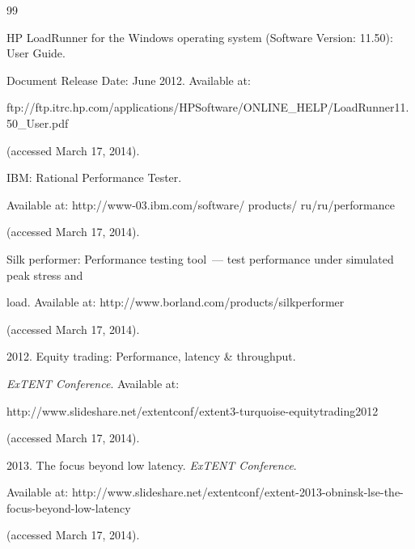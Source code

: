 {{\begin{thebibliography}{99}


  HP LoadRunner for the Windows operating system (Software Version: 11.50): User Guide.


Document Release Date: June 2012. Available at: {\sf


ftp://ftp.itrc.hp.com/\linebreak applications/HPSoftware/ONLINE\_HELP/LoadRunner11.50\_User.pdf}


(accessed March 17, 2014).







  IBM: Rational Performance Tester.


Available at:   {\sf http://www-03.ibm.com/software/ products/ ru/ru/performance}


(accessed March 17, 2014).







  Silk performer: Performance testing tool~--- test performance under simulated peak stress and


load. Available at: {\sf http://www.borland.com/products/silkperformer}


(accessed March 17, 2014).







   2012. Equity trading: Performance, latency \& throughput.


  \textit{ExTENT Conference}. Available at:


  {\sf http://www.slideshare.net/extentconf/extent3-turquoise-equitytrading2012}


(accessed March 17, 2014).









  2013. The focus beyond low latency. \textit{ExTENT Conference}.


  Available at:  {\sf http://www.slideshare.net/extentconf/extent-2013-obninsk-lse-the-focus-beyond-low-latency}


(accessed March 17, 2014).








\end{thebibliography}}}
